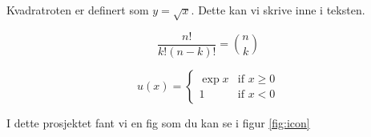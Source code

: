 \documentclass[a4paper]{article}
\begin{document}
Kvadratroten er definert som $y = \sqrt{x}$. Dette kan vi skrive inne i teksten.

\begin{equation*} \label{eq:combinatorics}
    \frac{n!}{k!(n-k)!} = \binom{n}{k}
\end{equation*}


\begin{equation}
  
    u(x) = 
        \begin{cases}
            \exp{x} & \text{if } x \geq 0 \\
            1 & \text{if } x < 0
        \end{cases}
    
\end{equation}

I dette prosjektet fant vi en fig som du kan se i figur \ref{fig:icon}


% 
% 
\end{document}
